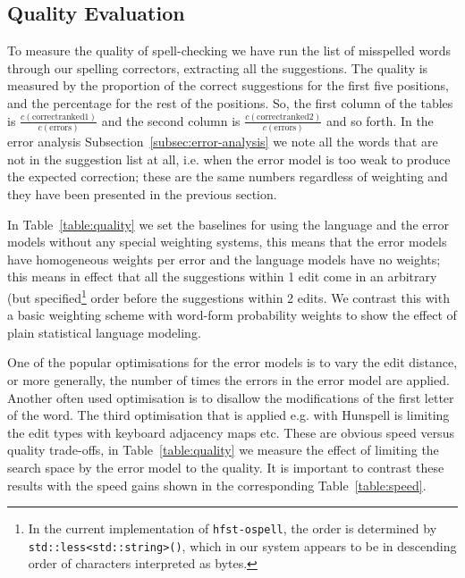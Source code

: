 \documentclass[a4paper,12pt]{article}
\begin{document}
\subsection{Quality Evaluation}

To measure the quality of spell-checking we have run the list of misspelled
words through our spelling correctors, extracting all the suggestions.  The
quality is measured by the proportion of the correct suggestions for the first
five positions, and the percentage for the rest of the positions. So, the first
column of the tables is $\frac{c(\mathrm{correct ranked
1})}{c(\mathrm{errors})}$ and the second column is $\frac{c(\mathrm{correct
ranked 2})}{c(\mathrm{errors})}$ and so forth.  In the error analysis
Subsection~\ref{subsec:error-analysis} we note all the words that are not in
the suggestion list at all, i.e. when the error model is too weak to produce
the expected correction; these are the same numbers regardless of weighting and
they have been presented in the previous section.

In Table~\ref{table:quality} we set the baselines for using the language and
the error models without any special weighting systems, this means that the
error models have homogeneous weights per error and the language models have no
weights; this means in effect that all the suggestions within 1 edit come in an
arbitrary (but specified\footnote{In the current implementation of
    \texttt{hfst-ospell}, the order is determined by
    \texttt{std::less<std::string>()}, which in our system appears to be in
descending order of characters interpreted as bytes.} order before the
suggestions within 2 edits.  We contrast this with a basic weighting scheme
with word-form probability weights to show the effect of plain statistical
language modeling.

One of the popular optimisations for the error models is to vary the edit
distance, or more generally, the number of times the errors in the error model
are applied.  Another often used optimisation is to disallow the
modifications of the first letter of the word. The third optimisation that is
applied e.g.  with Hunspell is limiting the edit types with keyboard adjacency
maps etc.  These are obvious speed versus quality trade-offs, in
Table~\ref{table:quality} we measure the effect of limiting the search space by
the error model to the quality. It is important to contrast these results with
the speed gains shown in the corresponding Table~\ref{table:speed}.
\end{document}

